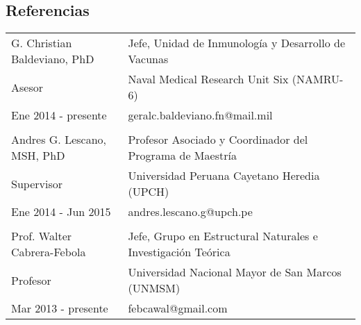 \documentclass[margin,line]{res}
\begin{document}
\begin{resume}
		
		\section{\sc Referencias}
		
		\begin{tabular}{ l l }
			G. Christian Baldeviano, PhD & Jefe, Unidad de Inmunología y Desarrollo de Vacunas\\
			Asesor & Naval Medical Research Unit Six (NAMRU-6)\\
			Ene 2014 - presente & geralc.baldeviano.fn@mail.mil\\
			&\\
			Andres G. Lescano, MSH, PhD & Profesor Asociado y Coordinador del Programa de Maestría\\
			Supervisor & Universidad Peruana Cayetano Heredia (UPCH)\\
			Ene 2014 - Jun 2015 & andres.lescano.g@upch.pe\\
			&\\
			Prof. Walter Cabrera-Febola & Jefe, Grupo en Estructural Naturales e Investigación Teórica\\
			Profesor & Universidad Nacional Mayor de San Marcos (UNMSM)\\
			Mar 2013 - presente & febcawal@gmail.com\\	
		\end{tabular}
		
		
		
		
		
		
		
		
		
		
		
		
		
		

\end{resume}
\end{document}
